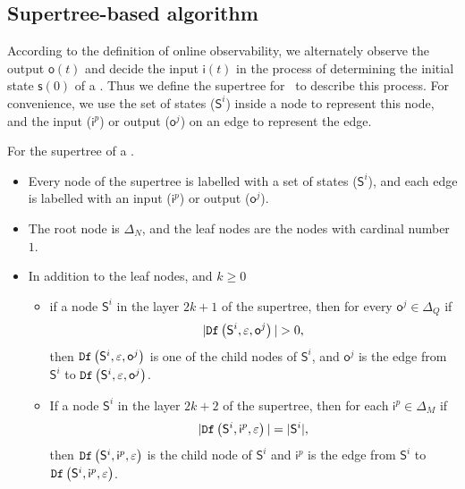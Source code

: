 \subsection{Supertree-based algorithm} %
According to the definition of online observability, we alternately observe the output $\mathsf{o}(t)$ and decide the input $\mathsf{i}(t)$ in the process of determining the initial state $\mathsf{s}(0)$ of a \BCN. Thus we define the supertree for \BCNs\ to describe this process. For convenience, we use the set of states ($\mathsf{S}^i$) inside a node to represent this node, and the input ($\mathsf{i}^p$) or output ($\mathsf{o}^j$) on an edge to represent the edge.
\begin{definition}[Supertree]
For the supertree of a \BCN.   
\begin{itemize}
 \item  Every node of the supertree is labelled with a set of states ($\mathsf{S}^i$), and each edge is labelled with an input ($\mathsf{i}^p$) or output ($\mathsf{o}^j$).
 \item  The root node is $\Delta_N$, and the leaf nodes are the nodes with cardinal number $1$.%
 \item In addition to the leaf nodes, and $k\ge0$
 \begin{itemize}
 \item if a node $\mathsf{S}^i$ in the layer $2k + 1$ of the supertree, then for every $\mathsf{o}^j\in \Delta_Q$ if
\[|\Ded\left(\mathsf{S}^i,\varepsilon, \mathsf{o}^j\right)|>0,\]
 then ${\tt Df}\left(\mathsf{S}^i,\varepsilon, \mathsf{o}^j\right)$ is one of the child nodes of $\mathsf{S}^i$, and $\mathsf{o}^j$ is the edge from $\mathsf{S}^i$ to ${\tt Df}\left(\mathsf{S}^i,\varepsilon, \mathsf{o}^j\right)$.
 \item If a node $\mathsf{S}^i$ in the layer $2k+2$ of the supertree, then for each $\mathsf{i}^p \in \Delta_M$ if
\[|{\tt Df}\left(\mathsf{S}^i,\mathsf{i}^p,\varepsilon\right)|=|\mathsf{S}^i|,\] 
then ${\tt Df}\left(\mathsf{S}^i,\mathsf{i}^p,\varepsilon\right)$ is the child node of $\mathsf{S}^i$ and $\mathsf{i}^p$ is the edge from $\mathsf{S}^i$ to ${\tt Df}\left(\mathsf{S}^i,\mathsf{i}^p,\varepsilon\right)$. 
 \end{itemize}
 
  
 \end{itemize}
\label{def:super-tree}
\end{definition}

